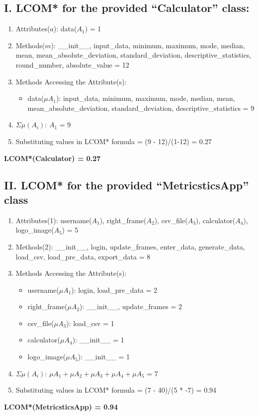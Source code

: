 \documentclass[english,12pt,a4paper]{report}
\begin{document}
	\subsection*{I. LCOM* for the provided ``Calculator'' class:}
	\begin{enumerate}[label=\arabic*.]
		\item Attributes(\(a\)): data(\(A_1\)) = 1
		\item Methods(\(m\)): \_\_init\_\_, input\_data, minimum, maximum, mode, median, mean, mean\_absolute\_deviation, standard\_deviation, descriptive\_statistics, round\_number, absolute\_value = 12
		\item Methods Accessing the Attribute(s):
		\begin{itemize}[label={$\bullet$}]
			\item data(\(\mu A_1\)): input\_data, minimum, maximum, mode, median, mean, mean\_absolute\_deviation, standard\_deviation, descriptive\_statistics = 9
		\end{itemize}
		\item \(\Sigma \mu(A_i)\): \(A_1\) = 9
		\item Substituting values in LCOM* formula = (9 - 12)/(1-12) = 0.27
	\end{enumerate}
	\textbf{LCOM*(Calculator) = 0.27}
	
	
	\subsection*{II. LCOM* for the provided ``MetricsticsApp'' class}
	\begin{enumerate}[label=\arabic*.]
		\item Attributes(1): username(\(A_1\)), right\_frame(\(A_2\)), csv\_file(\(A_3\)), calculator(\(A_4\)), logo\_image(\(A_5\)) = 5
		\item Methods(2): \_\_init\_\_, login, update\_frames, enter\_data, generate\_data, load\_csv, load\_pre\_data, export\_data = 8
		\item Methods Accessing the Attribute(s):
		\begin{itemize}[label={$\bullet$}]
			\item username(\(\mu A_1\)): login, load\_pre\_data = 2
			\item right\_frame(\(\mu A_2\)): \_\_init\_\_, update\_frames = 2
			\item csv\_file(\(\mu A_3\)): load\_csv = 1
			\item calculator(\(\mu A_4\)): \_\_init\_\_ = 1
			\item logo\_image(\(\mu A_5\)): \_\_init\_\_ = 1
		\end{itemize}
		\item \(\Sigma\mu(A_i)\): \(\mu A_1 + \mu A_2 + \mu A_3 + \mu A_4 + \mu A_5\) = 7
		\item Substituting values in LCOM* formula = (7 - 40)/(5 * -7) = 0.94
	\end{enumerate}
	\textbf{LCOM*(MetricsticsApp) = 0.94}
	
\end{document}
